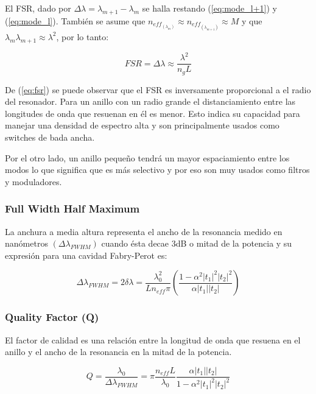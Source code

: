 El FSR, dado por $\Delta \lambda=\lambda_{m+1}-\lambda_m$ se halla restando
(\ref{eq:mode_l+1}) y (\ref{eq:mode_l}). También se 
asume que $n_{eff_{(\lambda_m)}} \approx n_{eff_{(\lambda_{m+1})}} \approx M $ 
y que $\lambda_m \lambda_{m+1} \approx \lambda^2 $, por lo tanto:

\begin{equation}
FSR=\Delta \lambda \approx \frac{\lambda^2}{n_g L}  
\label{eq:fsr}
\end{equation} 


De (\ref{eq:fsr}) se puede observar que el FSR es inversamente proporcional a el 
radio del resonador. Para un anillo con un radio grande el distanciamiento
entre las longitudes de onda que resuenan en él es menor. Esto indica su capacidad
para manejar una densidad de espectro alta y son principalmente usados como switches
de bada ancha. 

Por el otro lado, un anillo pequeño tendrá un mayor espaciamiento
entre los modos lo que significa que es más selectivo \cite{Chan2011} y por
eso son muy usados como filtros y moduladores.

\subsubsection{Full Width Half Maximum}

La anchura a media altura representa el ancho de la resonancia
medido en nanómetros $(\Delta \lambda_{FWHM})$ cuando ésta 
decae 3dB o mitad de la potencia y su expresión
para una cavidad Fabry-Perot \cite{paloczi2005polymer}\cite{verdeyen1989laser} es:

\begin{equation}
\Delta \lambda_{FWHM}=2\delta \lambda
    =\frac{\lambda_0^2}{L n_{eff} \pi} 
     \left( \frac{1-\alpha^2|t_1|^2|t_2|^2}{\alpha |t_1||t_2|}  \right)
\label{eq:fwhm}
\end{equation} 

\subsubsection{Quality Factor (Q)}

El factor de calidad es una relación entre la longitud de onda que resuena en el 
anillo y el ancho de la resonancia en la mitad de la potencia.

\begin{equation}
Q = \frac{\lambda_0}{\Delta \lambda_{FWHM}} 
  = \pi \frac{n_{eff} L}{\lambda_0} \frac{\alpha|t_1||t_2|}{1-\alpha^2|t_1|^2|t_2|^2}
\label{eq:q}
\end{equation}

